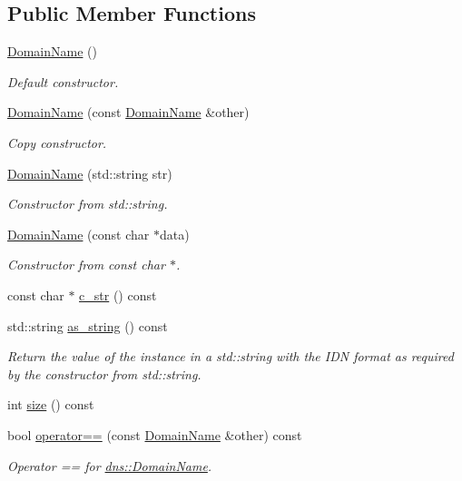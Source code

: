 \subsection*{Public Member Functions}
\begin{DoxyCompactItemize}
\item 
\hyperlink{structdns_1_1DomainName_aa6753a696606acc35cb7df58ae22ca8d}{Domain\+Name} ()
\begin{DoxyCompactList}\small\item\em Default constructor. \end{DoxyCompactList}\item 
\hyperlink{structdns_1_1DomainName_ad60b6906c878a459d90e581e38a14b88}{Domain\+Name} (const \hyperlink{structdns_1_1DomainName}{Domain\+Name} \&other)
\begin{DoxyCompactList}\small\item\em Copy constructor. \end{DoxyCompactList}\item 
\hyperlink{structdns_1_1DomainName_ae5672debce76216a4fdc132d2f793f7d}{Domain\+Name} (std\+::string str)
\begin{DoxyCompactList}\small\item\em Constructor from std\+::string. \end{DoxyCompactList}\item 
\hyperlink{structdns_1_1DomainName_ae4dfa596bfe1f9a2ee9aa7d6a08a1288}{Domain\+Name} (const char $\ast$data)
\begin{DoxyCompactList}\small\item\em Constructor from const char $\ast$. \end{DoxyCompactList}\item 
const char $\ast$ \hyperlink{structdns_1_1DomainName_ae02a0ca9015d761bbea80711d18f4bf6}{c\+\_\+str} () const 
\item 
std\+::string \hyperlink{structdns_1_1DomainName_a139b1cb39d27b693f7662698e865536d}{as\+\_\+string} () const 
\begin{DoxyCompactList}\small\item\em Return the value of the instance in a std\+::string with the I\+DN format as required by the constructor from std\+::string. \end{DoxyCompactList}\item 
int \hyperlink{structdns_1_1DomainName_a894ccfcd88ac1ad2425b2bfe9ce826a6}{size} () const 
\item 
bool \hyperlink{structdns_1_1DomainName_a3c69c68df68eff0fa0f5009958119ba6}{operator==} (const \hyperlink{structdns_1_1DomainName}{Domain\+Name} \&other) const 
\begin{DoxyCompactList}\small\item\em Operator == for \hyperlink{structdns_1_1DomainName}{dns\+::\+Domain\+Name}. \end{DoxyCompactList}\end{DoxyCompactItemize}
